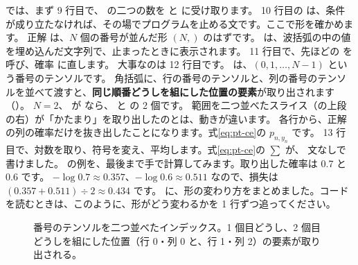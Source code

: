  では、まず 9 行目で、 の二つの数を  と  に受け取ります。
10 行目の  は、条件が成り立たなければ、その場でプログラムを止める文です。ここで形を確かめます。
正解  は、$N$ 個の番号が並んだ形 $(N,)$ のはずです。
 は、波括弧の中の値を埋め込んだ文字列で、止まったときに表示されます。
11 行目で、先ほどの  を呼び、確率  に直します。
大事なのは 12 行目です。 は、$(0,1,\dots,N-1)$ という番号のテンソルです。
角括弧に、行の番号のテンソルと、列の番号のテンソルを並べて渡すと、\textbf{同じ順番どうしを組にした位置の要素}が取り出されます（）。
$N=2$、 が \code{[0, 2]} なら、 と  の 2 個です。
範囲を二つ並べたスライス（の上段の右）が「かたまり」を取り出したのとは、動きが違います。
各行から、正解の列の確率だけを抜き出したことになります。式\eqref{eq:pt-ce}の $p_{n,y_n}$ です。
13 行目で、対数を取り、符号を変え、平均します。式\eqref{eq:pt-ce}の $\sum$ が、 文なしで書けました。
の例を、最後まで手で計算してみます。取り出した確率は 0.7 と 0.6 です。
$-\log 0.7\approx 0.357$、$-\log 0.6\approx 0.511$ なので、損失は $(0.357+0.511)\div 2\approx 0.434$ です。
に、形の変わり方をまとめました。コードを読むときは、このように、形がどう変わるかを 1 行ずつ追ってください。

\begin{figure}[tbp]
\centering
{}
\caption{番号のテンソルを二つ並べたインデックス。1 個目どうし、2 個目どうしを組にした位置（行 0・列 0 と、行 1・列 2）の要素が取り出される。}
\label{fig:pt-pick}
\end{figure}

